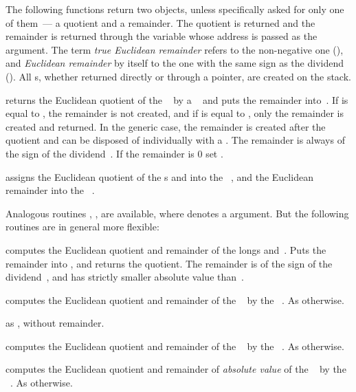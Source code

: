  The following functions return two objects,
unless specifically asked for only one of them~--- a quotient and a remainder.
The quotient is returned and the remainder is returned through the variable
whose address is passed as the  argument. The term \emph{true
Euclidean remainder} refers to the non-negative one (), and
\emph{Euclidean remainder} by itself to the one with the same sign as the
dividend (). All s, whether returned directly or through a
pointer, are created on the stack.

 returns the Euclidean quotient of the
~ by a ~ and puts the remainder
into~. If  is equal to , the remainder is not
created, and if  is equal to  , only the remainder is
created and returned. In the generic case, the remainder is created after the
quotient and can be disposed of individually with a . The
remainder is always of the sign of the dividend~. If the remainder
is $0$ set .

 assigns the Euclidean
quotient of the s  and  into the ~,
and the Euclidean remainder into the ~.

\noindent Analogous routines \kbd{[z]}, \kbd{[z]},
\kbd{[z]} are available, where  denotes a 
argument. But the following routines are in general more flexible:

 computes the Euclidean
quotient and remainder of the longs  and~. Puts the remainder
into , and returns the quotient. The remainder is of the sign of the
dividend~, and has strictly smaller absolute value than~.

 computes the Euclidean
quotient and remainder of the ~ by the ~. As
 otherwise.

 as , without
remainder.

 computes the Euclidean quotient
and remainder of the ~ by the ~. As
 otherwise.

 computes the Euclidean quotient
and remainder of \emph{absolute value} of the ~ by the
~. As  otherwise.

